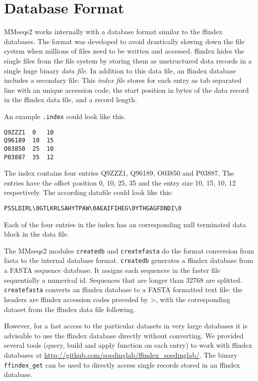 \documentclass[11pt,a4paper]{scrreprt}
\begin{document}
\section{Database Format}
MMseqs2 works internally with a database format similar to the ffindex databases. The format was developed to avoid drastically slowing down the file system when millions of files need to be written and accessed. ffindex hides the single files from the file system by storing them as unstructured data records in a single huge binary \emph{data file}. In addition to this data file, an ffindex database includes a secondary file: This \emph{index file} stores for each entry as tab separated line with an unique accession code, the start position in bytes of the data record in the ffindex data file, and a record length.

An example \texttt{.index} could look like this.

\begin{verbatim}
Q9ZZZ1	0	10
Q96189	10	15	
O03850	25	10
P03887	35	12
\end{verbatim}

The index contains four entries Q9ZZZ1, Q96189, O03850 and P03887. The entries have the offset position 0, 10, 25, 35 and the entry size 10, 15, 10, 12 respectively. 
The according datafile could look like this:
\begin{verbatim}
PSSLDIRL\0GTLKRLSAHYTPAW\0AEAIFIHEG\0YTHGAGFDNDI\0
\end{verbatim}
Each of the four entries in the index has an corresponding null terminated data block in the data file. 



The MMseqs2 modules \texttt{createdb} and \texttt{createfasta} do the format conversion from fasta to the internal database format. 
\texttt{createdb} generates a ffindex database from a FASTA sequence database. It assigns each sequences in the faster file sequentially a numerical id. Sequences that are longer than 32768 are splitted. 
\texttt{createfasta} converts an ffindex database to a FASTA formatted text file: the headers are ffindex accession codes preceded by \textgreater, with the corresponding dataset from the ffindex data file following.

However, for a fast access to the particular datasets in very large databases it is advisable to use the ffindex database directly without converting. We provided several tools (query, build and apply function on each entry) to work with ffindex databases at \url{http://github.com/soedinglab/ffindex_soedinglab/}. The binary \texttt{ffindex\_get} can be used to directly access single records stored in an ffindex database.
\end{document}
